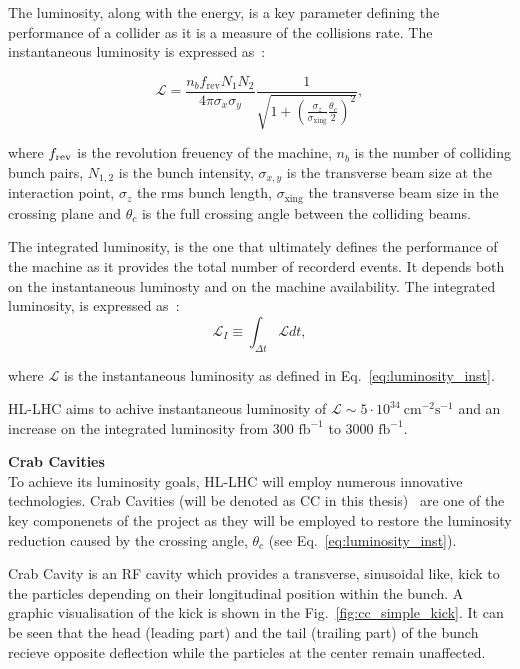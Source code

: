The luminosity, along with the energy, is a key parameter defining the performance of a collider as it is a measure of the collisions rate. The instantaneous luminosity is expressed as~\cite{luminosity}:

\begin{equation}\label{eq:luminosity_inst}
    \mathcal{L} = \frac{n_b f_\mathrm{rev}N_1 N_2}{4 \pi \sigma_x \sigma_y} \frac{1}{\sqrt{1+(\frac{\sigma_z}{\sigma_\mathrm{xing}} \frac{\theta_c}{2})^2}},
\end{equation}

where ${f_\mathrm{rev}}$ is the revolution freuency of the machine, $n_b$ is the number of colliding bunch pairs, $N_{1,2}$ is the bunch intensity, $\sigma_{x,y}$ is the transverse beam size at the interaction point, $\sigma_z$ the rms bunch length, $\sigma_{\mathrm{xing}}$ the transverse beam size in the crossing plane and $\theta_c$ is the full crossing angle between the colliding beams.

The integrated luminosity, is the one that ultimately defines the performance of the machine as it provides the total number of recorderd events. It depends both on the instantaneous luminosty and on the machine availability. The integrated luminosity, is expressed as~\cite{HL_LHC_yellow_report}:
\begin{equation}\label{eq:integrated_luminosity}
    \mathcal{L}_I \equiv \int_{\Delta t} \mathcal{L} dt,
\end{equation}

where $\mathcal{L}$ is the instantaneous luminosity as defined in Eq.~\eqref{eq:luminosity_inst}.

HL-LHC aims to achive instantaneous luminosity of $\mathcal{L} \sim 5 \cdot 10^{34} \ \mathrm{cm^{-2} s^{-1}}$ and an increase on the integrated luminosity from 300 $\mathrm{fb^{-1}}$ to 3000 $\mathrm{fb^{-1}}$. %

\normalsize{\textbf{Crab Cavities}}\\
To achieve its luminosity goals, HL-LHC will employ numerous innovative technologies. Crab Cavities (will be denoted as CC in this thesis)~\cite{Calaga:2673544} are one of the key componenets of the project as they will be employed to restore the luminosity reduction caused by the crossing angle, $\theta_c$ (see Eq.~\eqref{eq:luminosity_inst}).

Crab Cavity is an RF cavity which provides a transverse, sinusoidal like, kick to the particles depending on their longitudinal position within the bunch. A graphic visualisation of the kick is shown in the Fig.~\ref{fig:cc_simple_kick}. It can be seen that the head (leading part) and the tail (trailing part) of the bunch recieve opposite deflection while the particles at the center remain unaffected.

